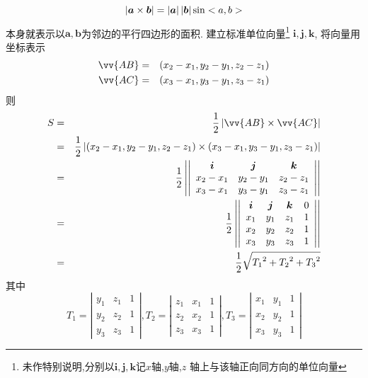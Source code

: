 $$\left| {\bm{a}\times\bm{b}} \right|=\left| {\bm{a}} \right|\left| {\bm{b}} \right|\sin<a,b>$$
本身就表示以$\bm{a},\bm{b}$为邻边的平行四边形的面积.
建立标准单位向量\footnote{
  未作特别说明,分别以$\bm{i},\bm{j},\bm{k}$记$x$轴,$y$轴,$z$
  轴上与该轴正向同方向的单位向量
  }
  $\bm{i},\bm{j},\bm{k}$, 将向量用坐标表示
\begin{eqnarray}
\vv{AB}&=&(x_2-x_1,y_2-y_1,z_2-z_1)\nonumber\\
\vv{AC}&=&(x_3-x_1,y_3-y_1,z_3-z_1)\nonumber
\end{eqnarray}
则
\begin{eqnarray}
  S&=&\frac{1}{2}\abs{\vv{AB}\times\vv{AC}}\nonumber\\
  &=&\frac{1}{2}\abs
  {(x_2-x_1,y_2-y_1,z_2-z_1)\times
  (x_3-x_1,y_3-y_1,z_3-z_1)}\nonumber\\
  &=&\frac{1}{2}\left|\left|
  \begin{array}{ccc}
    \bm{i} & \bm{j} & \bm{k} \\
    x_2-x_1 & y_2-y_1  & z_2-z_1 \\
    x_3-x_1 &y_3-y_1  & z_3-z_1 \\
  \end{array}
  \right|\right|\nonumber\\
  &=&\frac{1}{2}\left|\left|
  \begin{array}{cccc}
    \bm{i}&\bm{j}&\bm{k}&0\\
    x_1&y_1&z_1&1\\
    x_2&y_2 &z_2&1\\
    x_3&y_3&z_3&1\\
  \end{array}
  \right|\right|\nonumber\\
  &=&\frac{1}{2}\sqrt
  {
    {T_1}^2+
    {T_2}^2+
    {T_3}^2
  }\nonumber
\end{eqnarray}
其中
$$
T_1=\left|\begin{array}{ccc}
          y_1&z_1&1\\
          y_2&z_2&1\\
          y_3&z_3&1
          \end{array}\right|,
T_2=\left|\begin{array}{ccc}
  z_1&x_1&1\\
  z_2&x_2&1\\
  z_3&x_3&1
  \end{array}\right|,
T_3=\left|\begin{array}{ccc}
  x_1&y_1&1\\
  x_2&y_2&1\\
  x_3&y_3&1
  \end{array}\right|
$$
\solend


